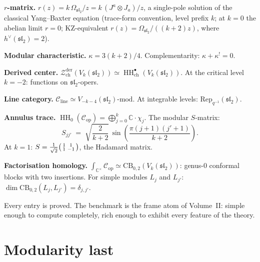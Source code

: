 \documentclass[11pt]{article}
\newcommand{\cC}{\mathcal{C}}
\newcommand{\cZ}{\mathcal{Z}}
\newcommand{\fsl}{\mathfrak{sl}}
\newcommand{\C}{\mathbb{C}}
\newcommand{\HH}{\operatorname{HH}}
\newcommand{\Zder}{\cZ^{\mathrm{der}}_{\mathrm{ch}}}
\begin{document}
\medskip

\noindent
\textbf{$r$-matrix.}
$r(z) = k\,\Omega_{\fsl_2}/z = k\,(J^a \otimes J_a)/z$, a single-pole
solution of the classical Yang--Baxter equation (trace-form convention, level prefix $k$; at $k=0$ the abelian limit $r = 0$; KZ-equivalent $r(z) = \Omega_{\fsl_2}/((k+2)z)$, where $h^\vee(\fsl_2)=2$).

\medskip

\noindent
\textbf{Modular characteristic.}
$\kappa = 3(k+2)/4$.  Complementarity: $\kappa + \kappa^! = 0$.

\medskip

\noindent
\textbf{Derived center.}
$\Zder(V_k(\fsl_2)) \simeq \HH^\bullet_{\mathrm{ch}}(V_k(\fsl_2))$.
At the critical level $k = -2$: functions on $\fsl_2$-opers.

\medskip

\noindent
\textbf{Line category.}
$\cC_{\mathrm{line}} \simeq V_{-k-4}(\fsl_2)\text{-mod}$.
At integrable levels: $\mathrm{Rep}_{q^{-1}}(\fsl_2)$.

\medskip

\noindent
\textbf{Annulus trace.}
$\HH_0(\cC_{\mathrm{op}}) = \bigoplus_{j=0}^k \C \cdot \chi_j$.
The modular $S$-matrix:
\[
S_{jj'} \;=\; \sqrt{\frac{2}{k+2}}\,
\sin\!\left(\frac{\pi(j+1)(j'+1)}{k+2}\right).
\]
At $k = 1$: $S = \frac{1}{\sqrt{2}}
\begin{psmallmatrix} 1 & 1 \\ 1 & -1 \end{psmallmatrix}$,
the Hadamard matrix.

\medskip

\noindent
\textbf{Factorisation homology.}
$\int_{\C^\times}\!\cC_{\mathrm{op}}
\simeq \mathrm{CB}_{0,2}(V_k(\fsl_2))$:
genus-$0$ conformal blocks with two insertions.  For simple
modules $L_j$ and $L_{j'}$:
$\dim \mathrm{CB}_{0,2}(L_j, L_{j'}) = \delta_{j,j'}$.

\medskip

Every entry is proved.  The benchmark is the frame atom of
Volume~II: simple enough to compute completely, rich enough to
exhibit every feature of the theory.


\section{Modularity last}
\label{sec:modularity-last}
\end{document}
